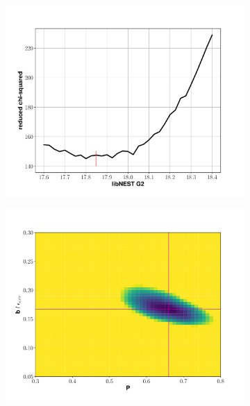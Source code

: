 {\begin{figure}[h!]
\centering
\begin{subfigure}{0.5\textwidth}
  \centering
  \includegraphics[width=\textwidth]{Figures/S2tail_g2fit_z.pdf}
\end{subfigure}%
\begin{subfigure}{0.5\textwidth}
  \centering
  \includegraphics[width=\textwidth]{Figures/S2tail_heatmap_z.pdf}
\end{subfigure}
\begin{subfigure}{0.5\textwidth}
  \centering

\end{subfigure}
\end{figure}}

